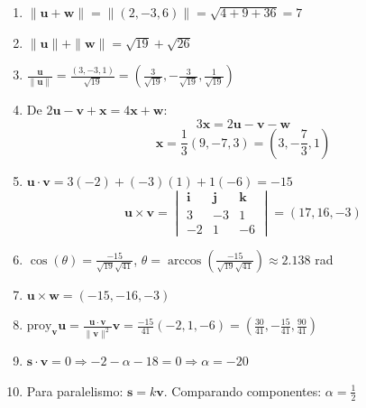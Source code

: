 \begin{prob}
\begin{myproof}
\begin{enumerate}[$(a)$]
\item $\|\mathbf{u} + \mathbf{w}\| = \|(2,-3,6)\| = \sqrt{4 + 9 + 36} = \boxed{7}$

\item $\|\mathbf{u}\| + \|\mathbf{w}\| = \boxed{\sqrt{19} + \sqrt{26}}$

\item $\frac{\mathbf{u}}{\|\mathbf{u}\|} = \frac{(3,-3,1)}{\sqrt{19}} = \boxed{\left(\frac{3}{\sqrt{19}}, -\frac{3}{\sqrt{19}}, \frac{1}{\sqrt{19}}\right)}$

\item De $2\mathbf{u} - \mathbf{v} + \mathbf{x} = 4\mathbf{x} + \mathbf{w}$:
$$3\mathbf{x} = 2\mathbf{u} - \mathbf{v} - \mathbf{w}$$
$$\mathbf{x} = \frac{1}{3}(9,-7,3) = \boxed{\left(3, -\frac{7}{3}, 1\right)}$$

\item $\mathbf{u} \cdot \mathbf{v} = 3(-2) + (-3)(1) + 1(-6) = \boxed{-15}$
$$\mathbf{u} \times \mathbf{v} = \begin{vmatrix}
\mathbf{i} & \mathbf{j} & \mathbf{k} \\
3 & -3 & 1 \\
-2 & 1 & -6
\end{vmatrix} = \boxed{(17,16,-3)}$$

\item $\cos(\theta) = \frac{-15}{\sqrt{19}\sqrt{41}}$, $\theta = \boxed{\arccos\left(\frac{-15}{\sqrt{19}\sqrt{41}}\right) \approx 2.138}$ rad

\item $\mathbf{u} \times \mathbf{w} = \boxed{(-15,-16,-3)}$

\item $\text{proy}_{\mathbf{v}}\mathbf{u} = \frac{\mathbf{u} \cdot \mathbf{v}}{\|\mathbf{v}\|^2}\mathbf{v} = \frac{-15}{41}(-2,1,-6) = \boxed{\left(\frac{30}{41}, -\frac{15}{41}, \frac{90}{41}\right)}$

\item $\mathbf{s} \cdot \mathbf{v} = 0 \Rightarrow -2 - \alpha - 18 = 0 \Rightarrow \boxed{\alpha = -20}$

\item Para paralelismo: $\mathbf{s} = k\mathbf{v}$. Comparando componentes: $\boxed{\alpha = \frac{1}{2}}$
\end{enumerate}
\end{myproof}
\end{prob}

